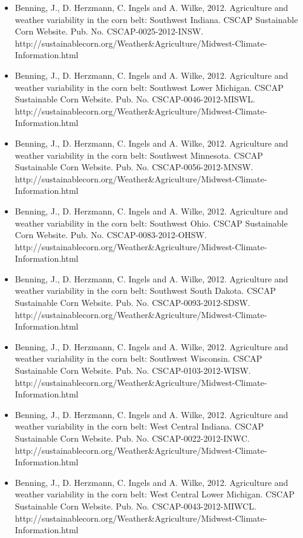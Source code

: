 \begin{itemize}
\item Benning, J., D. Herzmann, C. Ingels and A. Wilke, 2012. Agriculture and weather variability in the corn belt: Southwest Indiana. CSCAP Sustainable Corn Website. Pub. No. CSCAP-0025-2012-INSW. http://sustainablecorn.org/Weather\&Agriculture/Midwest-Climate-Information.html

\item Benning, J., D. Herzmann, C. Ingels and A. Wilke, 2012. Agriculture and weather variability in the corn belt: Southwest Lower Michigan. CSCAP Sustainable Corn Website. Pub. No. CSCAP-0046-2012-MISWL. http://sustainablecorn.org/Weather\&Agriculture/Midwest-Climate-Information.html

\item Benning, J., D. Herzmann, C. Ingels and A. Wilke, 2012. Agriculture and weather variability in the corn belt: Southwest Minnesota. CSCAP Sustainable Corn Website. Pub. No. CSCAP-0056-2012-MNSW. http://sustainablecorn.org/Weather\&Agriculture/Midwest-Climate-Information.html

\item Benning, J., D. Herzmann, C. Ingels and A. Wilke, 2012. Agriculture and weather variability in the corn belt: Southwest Ohio. CSCAP Sustainable Corn Website. Pub. No. CSCAP-0083-2012-OHSW. http://sustainablecorn.org/Weather\&Agriculture/Midwest-Climate-Information.html

\item Benning, J., D. Herzmann, C. Ingels and A. Wilke, 2012. Agriculture and weather variability in the corn belt: Southwest South Dakota. CSCAP Sustainable Corn Website. Pub. No. CSCAP-0093-2012-SDSW. http://sustainablecorn.org/Weather\&Agriculture/Midwest-Climate-Information.html

\item Benning, J., D. Herzmann, C. Ingels and A. Wilke, 2012. Agriculture and weather variability in the corn belt: Southwest Wisconsin. CSCAP Sustainable Corn Website. Pub. No. CSCAP-0103-2012-WISW. http://sustainablecorn.org/Weather\&Agriculture/Midwest-Climate-Information.html

\item Benning, J., D. Herzmann, C. Ingels and A. Wilke, 2012. Agriculture and weather variability in the corn belt: West Central Indiana. CSCAP Sustainable Corn Website. Pub. No. CSCAP-0022-2012-INWC. http://sustainablecorn.org/Weather\&Agriculture/Midwest-Climate-Information.html

\item Benning, J., D. Herzmann, C. Ingels and A. Wilke, 2012. Agriculture and weather variability in the corn belt: West Central Lower Michigan. CSCAP Sustainable Corn Website. Pub. No. CSCAP-0043-2012-MIWCL. http://sustainablecorn.org/Weather\&Agriculture/Midwest-Climate-Information.html


\end{itemize}
